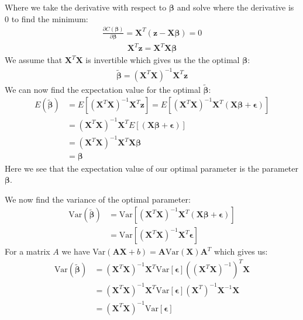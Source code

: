 \documentclass[12pt]{article}
\begin{document}
Where we take the derivative with respect to $\boldsymbol{\beta}$ and solve where the derivative is 0 to find the minimum:
\begin{align*}
  \frac{\partial C(\boldsymbol{\beta})}{\partial \boldsymbol{\beta}} = \boldsymbol{X}^T (\boldsymbol{z}- \boldsymbol{X}\boldsymbol{\beta}) =0
\end{align*}
\begin{align*}
  \boldsymbol{X}^T\boldsymbol{z} = \boldsymbol{X}^T \boldsymbol{X}\boldsymbol{\beta}
\end{align*}
We assume that $\boldsymbol{X}^T\boldsymbol{X}$ is invertible which gives us the the optimal $\boldsymbol{\beta}$:
\begin{align*}
  \boldsymbol{\tilde{\beta}} = (\boldsymbol{X}^T\boldsymbol{X})^{-1} \boldsymbol{X}^T\boldsymbol{z}
\end{align*}
We can now find the expectation value for the optimal $\boldsymbol{\tilde{\beta}}$:
\begin{align*}
  E(\boldsymbol{\tilde{\beta}}) &= E[(\boldsymbol{X}^T\boldsymbol{X})^{-1} \boldsymbol{X}^T\boldsymbol{z}] = E[(\boldsymbol{X}^T\boldsymbol{X})^{-1} \boldsymbol{X}^T(\boldsymbol{X}\boldsymbol{\beta} + \boldsymbol {\epsilon} )] \\
  &=  (\boldsymbol{X}^T\boldsymbol{X})^{-1} \boldsymbol{X}^TE[(\boldsymbol{X}\boldsymbol{\beta} + \boldsymbol {\epsilon} )] \\ &= (\boldsymbol{X}^T\boldsymbol{X})^{-1} \boldsymbol{X}^T\boldsymbol{X}\boldsymbol{\beta} \\&=  \boldsymbol{\beta}
\end{align*}
Here we see that the expectation value of our optimal parameter is the parameter $\boldsymbol{\beta}$.

We now find the variance of the optimal parameter:
\begin{align*}
  \text{Var}(\boldsymbol{\tilde{\beta}}) &= \text{Var}[(\boldsymbol{X}^T\boldsymbol{X})^{-1} \boldsymbol{X}^T(\boldsymbol{X}\boldsymbol{\beta} + \boldsymbol {\epsilon} )] \\
  &= \text{Var}[(\boldsymbol{X}^T\boldsymbol{X})^{-1} \boldsymbol{X}^T\boldsymbol {\epsilon} ]
\end{align*}
For a matrix $A$ we have Var$(\boldsymbol{AX}+b) = \boldsymbol{A}\text{Var}(\boldsymbol{X})\boldsymbol{A}^T$ which gives us:
\begin{align*}
  \text{Var}(\boldsymbol{\tilde{\beta}})&=(\boldsymbol{X}^T\boldsymbol{X})^{-1}\boldsymbol{X}^T\text{Var}[ {\boldsymbol{\epsilon}} ]((\boldsymbol{X}^T\boldsymbol{X})^{-1})^T\boldsymbol{X} \\  &=
  (\boldsymbol{X}^T\boldsymbol{X})^{-1}\boldsymbol{X}^T\text{Var}[ {\boldsymbol{\epsilon}} ](\boldsymbol{X}^T)^{-1}\boldsymbol{X}^{-1}\boldsymbol{X} \\&=
   (\boldsymbol{X}^T\boldsymbol{X})^{-1}\text{Var}[ {\boldsymbol{\epsilon}} ]
\end{align*}
\end{document}
